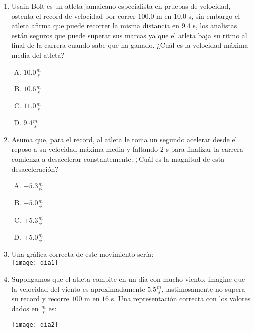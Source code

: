 \begin{enumerate}


\item Usain Bolt es un atleta jamaicano especialista en pruebas de velocidad, ostenta el record de velocidad por correr $100.0$ m en $10.0$ s, sin embargo el atleta afirma que puede recorrer la misma distancia en $9.4$ s, los analistas están seguros que puede superar sus marcas ya que el atleta baja su ritmo al final de la carrera cuando sabe que ha ganado. ¿Cuál es la velocidad máxima media del atleta? \label{dia-1}

\begin{enumerate}[(A)]
\item $10.0\frac{m}{s}$
\item $10.6\frac{m}{s}$
\item $11.0\frac{m}{s}$
\item $9.4\frac{m}{s}$
\end{enumerate}

\item Asuma que, para el record, al atleta le toma un segundo acelerar desde el reposo a su velocidad máxima media y faltando $2$ s para finalizar la carrera comienza a desacelerar constantemente. ¿Cuál es la magnitud de esta desaceleración?\label{dia-2}

\begin{enumerate}[(A)]
\item $-5.3 \frac{m}{s^2}$
\item $-5.0 \frac{m}{s^2}$
\item $+5.3 \frac{m}{s^2}$
\item $+5.0 \frac{m}{s^2}$
\end{enumerate}

\newpage
\item Una gráfica correcta de este movimiento sería: \label{dia-3}\\

\texttt{[image: dia1]}



\item Supongamos que el atleta compite en un día con mucho viento, imagine que la velocidad del viento es aproximadamente $5.5\frac{m}{s}$, lastimosamente no supera su record y recorre $100$ m en $16$ s. \label{dia-4}
\noindent Una representación correcta con los valores dados en $\frac{m}{s}$ es:

\texttt{[image: dia2]}


\end{enumerate}
